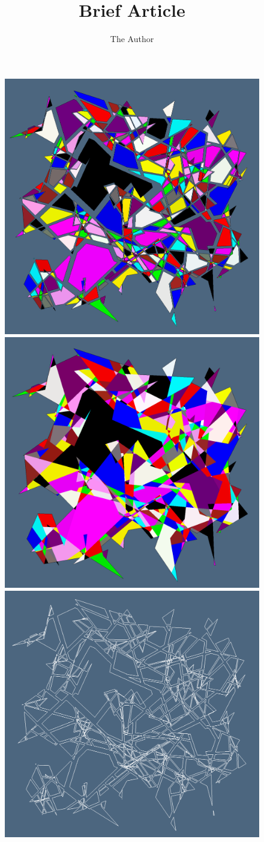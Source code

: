 \documentclass[11pt, oneside]{article}   	%
\title{Brief Article}
\author{The Author}
\begin{document}
\begin{figure}[htbp] %
   \centering
   \includegraphics[height=0.3\textwidth]{3.png}%
   \includegraphics[height=0.3\textwidth]{2.png}%
   \includegraphics[height=0.3\textwidth]{1.png}%
\end{figure}

%
%
\end{document}
